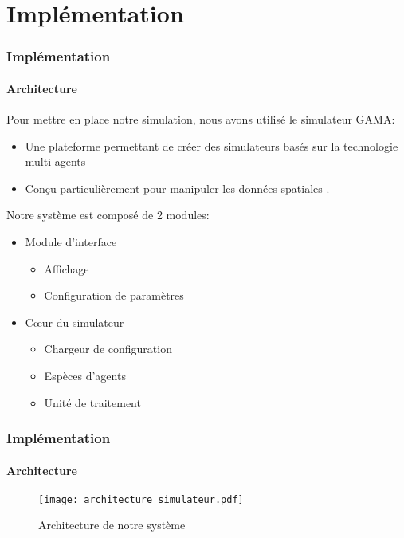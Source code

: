 \section{Implémentation}\label{implementation}
\begin{frame}
    \frametitle{Implémentation}
    \framesubtitle{Architecture}

    Pour mettre en place notre simulation, nous avons utilisé le simulateur GAMA:
    \begin{itemize}
        \item Une plateforme permettant de créer des simulateurs basés sur la technologie multi-agents
        \item Conçu particulièrement pour manipuler les données spatiales .
    \end{itemize}

    Notre système est composé de 2 modules:
    \begin{itemize}
        \item Module d'interface
        \begin{itemize}
            \item Affichage
            \item Configuration de paramètres
        \end{itemize}
        \item C\oe ur du simulateur
        \begin{itemize}
            \item Chargeur de configuration
            \item Espèces d'agents
            \item Unité de traitement
        \end{itemize}
    \end{itemize}

\end{frame}


\begin{frame}
    \frametitle{Implémentation}
    \framesubtitle{Architecture}

    \begin{figure}[h]
        \centering
        \texttt{[image: architecture\_simulateur.pdf]}
        \caption{Architecture de notre système}
        \label{fig:architecture-simulateur}
    \end{figure}
\end{frame}

